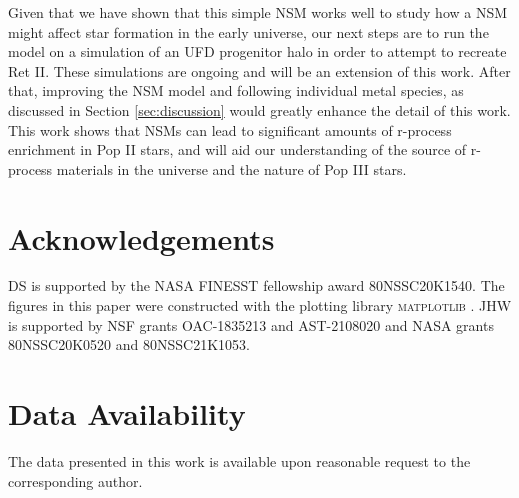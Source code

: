 \documentclass[fleqn,usenatbib]{mnras}
\begin{document}
Given that we have shown that this simple NSM works well to study how a NSM might affect star formation in the early universe, our next steps are to run the model on a simulation of an UFD progenitor halo in order to attempt to recreate Ret II. These simulations are ongoing and will be an extension of this work. After that, improving the NSM model and following individual metal species, as discussed in Section \ref{sec:discussion} would greatly enhance the detail of this work. This work shows that NSMs can lead to significant amounts of r-process enrichment in Pop II stars, and will aid our understanding of the source of r-process materials in the universe and the nature of Pop III stars.

\section*{Acknowledgements}

DS is supported by the NASA FINESST fellowship award 80NSSC20K1540. The figures in this paper were constructed with the plotting library \textsc{matplotlib} \citep{matplotlib}.  JHW is supported by NSF grants OAC-1835213 and AST-2108020 and NASA grants 80NSSC20K0520 and 80NSSC21K1053.

\section*{Data Availability}

The data presented in this work is available upon reasonable request to the corresponding author.



\typeout{}










\bsp	%
\label{lastpage}
\end{document}
